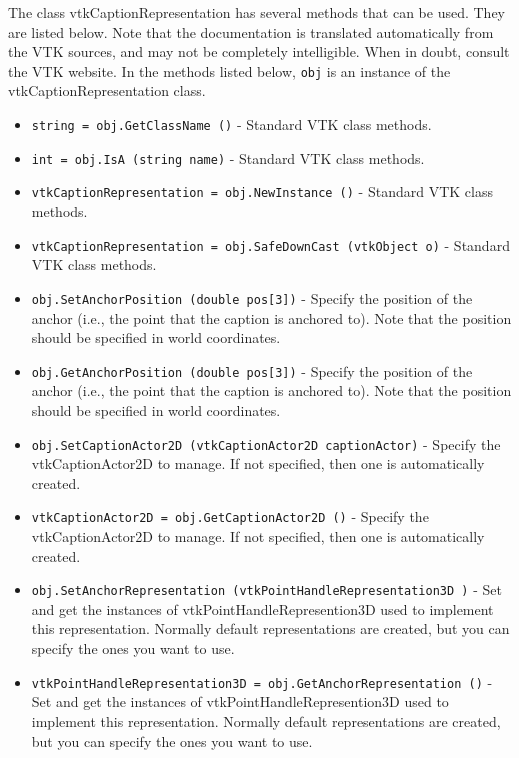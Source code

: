 The class vtkCaptionRepresentation has several methods that can be used.
  They are listed below.
Note that the documentation is translated automatically from the VTK sources,
and may not be completely intelligible.  When in doubt, consult the VTK website.
In the methods listed below, \verb|obj| is an instance of the vtkCaptionRepresentation class.
\begin{itemize}
\item  \verb|string = obj.GetClassName ()| -  Standard VTK class methods.

\item  \verb|int = obj.IsA (string name)| -  Standard VTK class methods.

\item  \verb|vtkCaptionRepresentation = obj.NewInstance ()| -  Standard VTK class methods.

\item  \verb|vtkCaptionRepresentation = obj.SafeDownCast (vtkObject o)| -  Standard VTK class methods.

\item  \verb|obj.SetAnchorPosition (double pos[3])| -  Specify the position of the anchor (i.e., the point that the caption is anchored to).
 Note that the position should be specified in world coordinates.

\item  \verb|obj.GetAnchorPosition (double pos[3])| -  Specify the position of the anchor (i.e., the point that the caption is anchored to).
 Note that the position should be specified in world coordinates.

\item  \verb|obj.SetCaptionActor2D (vtkCaptionActor2D captionActor)| -  Specify the vtkCaptionActor2D to manage. If not specified, then one
 is automatically created.

\item  \verb|vtkCaptionActor2D = obj.GetCaptionActor2D ()| -  Specify the vtkCaptionActor2D to manage. If not specified, then one
 is automatically created.

\item  \verb|obj.SetAnchorRepresentation (vtkPointHandleRepresentation3D )| -  Set and get the instances of vtkPointHandleRepresention3D used to implement this
 representation. Normally default representations are created, but you can
 specify the ones you want to use.

\item  \verb|vtkPointHandleRepresentation3D = obj.GetAnchorRepresentation ()| -  Set and get the instances of vtkPointHandleRepresention3D used to implement this
 representation. Normally default representations are created, but you can
 specify the ones you want to use.


\end{itemize}
